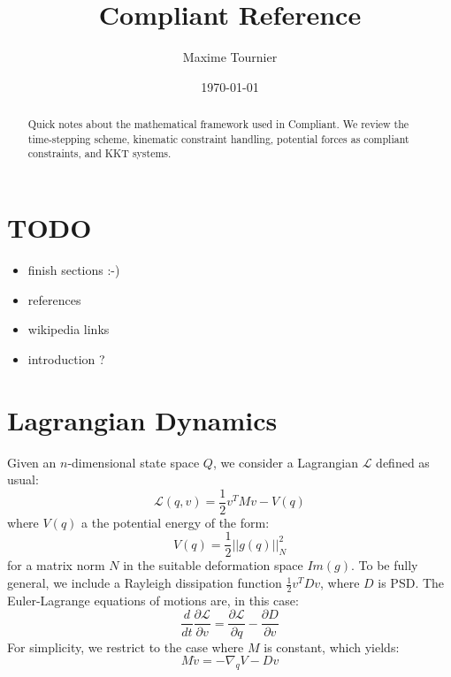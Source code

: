 \documentclass{article}
\newcommand{\LL}{\mathcal{L}}
\newcommand{\half}{\frac{1}{2}}
\newcommand{\norm}[1]{\left|\left|#1\right|\right|}
\newcommand{\ddd}[2]{\frac{\partial #1}{\partial #2}}
\begin{document}
\title{Compliant Reference}
\author{Maxime Tournier}
\date{\today}
\maketitle
%
\begin{abstract}
  Quick notes about the mathematical framework used in Compliant. We
  review the time-stepping scheme, kinematic constraint handling,
  potential forces as compliant constraints, and KKT systems.
\end{abstract}
%
\section*{TODO}
\begin{itemize}
\item finish sections :-)
\item references
\item wikipedia links
\item introduction ?
\end{itemize}
\section{Lagrangian Dynamics}
Given an $n$-dimensional state space $Q$, we consider a Lagrangian
$\LL$ defined as usual:
%
\begin{equation}
\LL(q, v) = \half v^TMv - V(q)
\end{equation}
%
where $V(q)$ a the potential energy of the form:
%
\begin{equation}
V(q) = \half \norm{g(q)}_N^2
\end{equation}
%
for a matrix norm $N$ in the suitable deformation space $Im(g)$. To be
fully general, we include a Rayleigh dissipation function $\half
v^TDv$, where $D$ is PSD. The Euler-Lagrange equations of motions are,
in this case:
%
\begin{equation}
 \frac{d}{dt}\ddd{\LL}{v} = \ddd{\LL}{q} - \ddd{D}{v} 
\end{equation}
%
For simplicity, we restrict to the case where $M$ is constant, which
yields:
%
\begin{equation}
  \label{eq:dynamics}
  M \dot{v} = -\nabla_q V - D v
\end{equation}
%
\end{document}
